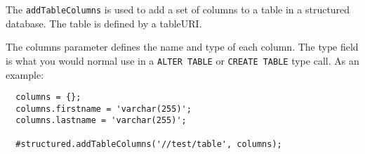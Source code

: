 The \verb+addTableColumns+ is used to add a set of columns to a table in a structured database. The table is defined
by a tableURI.

The columns parameter defines the name and type of each column. The type field is what you would
normal use in a \verb+ALTER TABLE+ or \verb+CREATE TABLE+ type call. As an example:

\begin{Verbatim}
  columns = {};
  columns.firstname = 'varchar(255)';
  columns.lastname = 'varchar(255)';

  #structured.addTableColumns('//test/table', columns);
\end{Verbatim}
